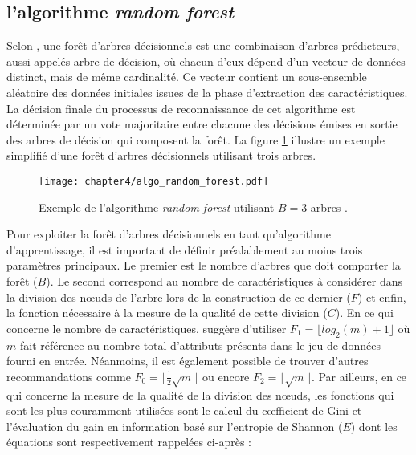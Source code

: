 \subsection{l'algorithme \textit{random forest}}

Selon \cite{Breiman2001}, une forêt d'arbres décisionnels est une combinaison d'arbres prédicteurs, aussi appelés arbre de décision, où chacun d'eux dépend d'un vecteur de données distinct, mais de même cardinalité. Ce vecteur contient un sous-ensemble aléatoire des données initiales issues de la phase d'extraction des caractéristiques. La décision finale du processus de reconnaissance de cet algorithme est déterminée par un vote majoritaire entre chacune des décisions émises en sortie des arbres de décision qui composent la forêt. La figure \ref{fig:algo_random_forest} illustre un exemple simplifié d'une forêt d'arbres décisionnels utilisant trois arbres.

\begin{figure}[H]
	\centering
	\texttt{[image: chapter4/algo\_random\_forest.pdf]}
  \caption[Exemple de l'algorithme \textit{random forest} utilisant $B=3$ arbres.]{Exemple de l'algorithme \textit{random forest} utilisant $B=3$ arbres \citep{Thullier2017}.}
	\label{fig:algo_random_forest}
\end{figure}

Pour exploiter la forêt d'arbres décisionnels en tant qu'algorithme d'apprentissage, il est important de définir préalablement au moins trois paramètres principaux. Le premier est le nombre d'arbres que doit comporter la forêt ($B$). Le second correspond au nombre de caractéristiques à considérer dans la division des n\oe{}uds de l'arbre lors de la construction de ce dernier ($F$) et enfin, la fonction nécessaire à la mesure de la qualité de cette division ($C$). En ce qui concerne le nombre de caractéristiques, \citeauthor{Breiman2001} suggère d'utiliser $F_1=\lfloor log_2(m) + 1\rfloor$ où $m$ fait référence au nombre total d'attributs présents dans le jeu de données fourni en entrée. Néanmoins, il est également possible de trouver d'autres recommandations comme $F_0=\lfloor \frac{1}{2}\sqrt{m}\rfloor$ ou encore $F_2=\lfloor \sqrt{m}\rfloor$. Par ailleurs, en ce qui concerne la mesure de la qualité de la division des n\oe{}uds, les fonctions qui sont les plus couramment utilisées sont le calcul du c\oe{}fficient de Gini et l'évaluation du gain en information basé sur l'entropie de Shannon ($E$) dont les équations sont respectivement rappelées ci-après :

